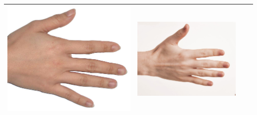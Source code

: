 \begin{longtable}{|N||c|c|c|}
\begin{minipage}{.29\textwidth}
    \includegraphics[width=\textwidth,height=\textheight,keepaspectratio]{../inputs/hand_light.jpg}
  \end{minipage} & 
  \begin{minipage}{.29\textwidth}
    \includegraphics[width=\textwidth,height=\textheight,keepaspectratio]{../rc_test/outputs/20170516_proportional_test/hand_pale_to_hand_light.jpg}
  \end{minipage} \\
\hline
 \end{longtable}
